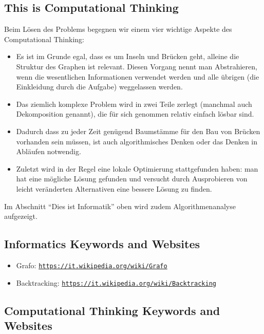 \documentclass[a4paper,11pt]{report}
\newcommand{\BrochureUrlText}[1]{\texttt{#1}}
\begin{document}
\subsection*{This is Computational Thinking}

Beim Lösen des Problems begegnen wir einem vier wichtige Aspekte des Computational Thinking:

\begin{itemize}
  \item Es ist im Grunde egal, dass es um Inseln und Brücken geht, alleine die Struktur des Graphen ist relevant. Diesen Vorgang nennt man Abstrahieren, wenn die wesentlichen Informationen verwendet werden und alle übrigen (die Einkleidung durch die Aufgabe) weggelassen werden.
  \item Das ziemlich komplexe Problem wird in zwei Teile zerlegt (manchmal auch Dekomposition genannt), die für sich genommen relativ einfach lösbar sind.
  \item Dadurch dass zu jeder Zeit genügend Baumstämme für den Bau von Brücken vorhanden sein müssen, ist auch algorithmisches Denken oder das Denken in Abläufen notwendig.
  \item Zuletzt wird in der Regel eine lokale Optimierung stattgefunden haben: man hat eine mögliche Lösung gefunden und versucht durch Ausprobieren von leicht veränderten Alternativen eine bessere Lösung zu finden.
\end{itemize}

Im Abschnitt \enquote{Dies ist Informatik} oben wird zudem Algorithmenanalyse aufgezeigt.


\subsection*{Informatics Keywords and Websites}

\begin{itemize}
  \item Grafo: \href{https://it.wikipedia.org/wiki/Grafo}{\BrochureUrlText{https://it.wikipedia.org/wiki/Grafo}}
  \item Backtracking: \href{https://it.wikipedia.org/wiki/Backtracking}{\BrochureUrlText{https://it.wikipedia.org/wiki/Backtracking}}
\end{itemize}


\subsection*{Computational Thinking Keywords and Websites}
\end{document}
